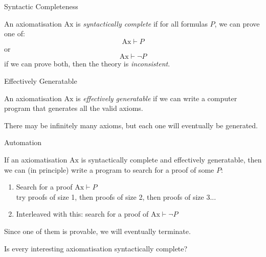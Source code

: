 \documentclass[xetex,aspectratio=169,14pt,hyperref={pdfpagelabels=true,pdflang={en-GB}}]{beamer}
\begin{document}
\begin{frame}
  {Syntactic Completeness}

  An axiomatisation $\mathrm{Ax}$ is \emph{syntactically complete} if
  for all formulas $P$, we can prove one of:
  \begin{displaymath}
    \mathrm{Ax} \vdash P
  \end{displaymath}
  or
  \begin{displaymath}
    \mathrm{Ax} \vdash \lnot P
  \end{displaymath}
  if we can prove both, then the theory is \emph{inconsistent}.
\end{frame}

\begin{frame}
  {Effectively Generatable}

  An axiomatisation $\mathrm{Ax}$ is \emph{effectively generatable} if
  we can write a computer program that generates all the valid axioms.

  \bigskip

  There may be infinitely many axioms, but each one will eventually be
  generated.
\end{frame}

\begin{frame}
  {Automation}

  If an axiomatisation $\mathrm{Ax}$ is syntactically complete and
  effectively generatable, then we can (in principle) write a program
  to search for a proof of some $P$:

  \bigskip

  \begin{enumerate}
  \item Search for a proof $\mathrm{Ax} \vdash P$ \\
    try proofs of size 1, then proofs of size 2, then proofs of size 3...
  \item Interleaved with this: search for a proof of $\mathrm{Ax} \vdash \lnot P$
  \end{enumerate}

  \bigskip

  Since one of them is provable, we will eventually terminate.
\end{frame}

\begin{frame}
  \begin{center}
    Is every interesting axiomatisation syntactically complete?
  \end{center}
\end{frame}
\end{document}
